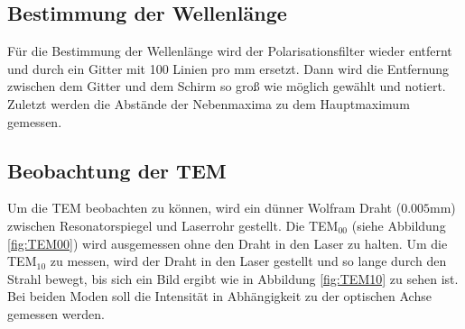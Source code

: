 \subsection{Bestimmung der Wellenlänge}
Für die Bestimmung der Wellenlänge wird der Polarisationsfilter wieder entfernt und durch ein Gitter mit 100 Linien pro mm ersetzt. Dann wird die Entfernung zwischen dem Gitter und dem Schirm so groß wie möglich gewählt und notiert. Zuletzt werden die Abstände der Nebenmaxima zu dem Hauptmaximum gemessen.

\subsection{Beobachtung der TEM}
Um die TEM beobachten zu können, wird ein dünner Wolfram Draht ($0.005$mm) zwischen Resonatorspiegel und Laserrohr gestellt. Die TEM$_{00}$ (siehe Abbildung \eqref{fig:TEM00}) wird ausgemessen ohne den Draht in den Laser zu halten. Um die TEM$_{10}$ zu messen, wird der Draht in den Laser gestellt und so lange durch den Strahl bewegt, bis sich ein Bild ergibt wie in Abbildung \eqref{fig:TEM10} zu sehen ist. Bei beiden Moden soll die Intensität in Abhängigkeit zu der optischen Achse gemessen werden.

